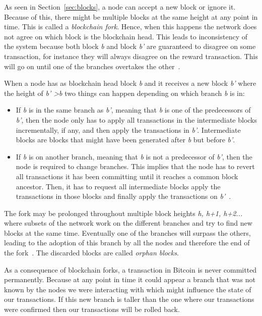 As seen in Section~\ref{sec:blocks}, a node can accept a new block or ignore it. Because of this, there might be multiple blocks at the same height at any point in time. This is called a \textit{blockchain fork}. Hence, when this happens the network does not agree on which block is the blockchain head. This leads to inconsistency of the system because both block \textit{b} and block \textit{b'} are guaranteed to disagree on some transaction, for instance they will always disagree on the reward transaction. This will go on until one of the branches overtakes the other~\cite{decker2013information}.

When a node has as blockchain head block \textit{b} and it receives a new block \textit{b'} where the height of \textit{b' \textgreater b} two things can happen depending on which branch \textit{b} is in:
\begin{itemize}
\item If \textit{b} is in the same branch as \textit{b'}, meaning that \textit{b} is one of the predecessors of \textit{b'}, then the node only has to apply all transactions in the intermediate blocks incrementally, if any, and then apply the transactions in \textit{b'}. Intermediate blocks are blocks that might have been generated after \textit{b} but before \textit{b'}.
\item If \textit{b} is on another branch, meaning that \textit{b} is not a predecessor of \textit{b'}, then the node is required to change branches. This implies that the node has to revert all transactions it has been committing until it reaches a common block ancestor. Then, it has to request all intermediate blocks apply the transactions in those blocks and finally apply the transactions on \textit{b'}~\cite{decker2013information}.
\end{itemize}

The fork may be prolonged throughout multiple block heights \textit{h, h+1, h+2...} where subsets of the network work on the different branches and try to find new blocks at the same time. Eventually one of the branches will surpass the others, leading to the adoption of this branch by all the nodes and therefore the end of the fork~\cite{decker2013information}. The discarded blocks are called \textit{orphan blocks}.

As a consequence of blockchain forks, a transaction in Bitcoin is never committed permanently. Because at any point in time it could appear a branch that was not known by the nodes we were interacting with which might influence the state of our transactions. If this new branch is taller than the one where our transactions were confirmed then our transactions will be rolled back.


